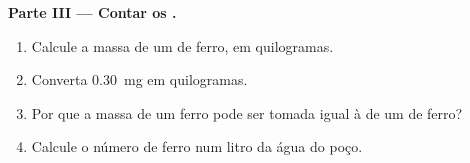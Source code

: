 \begin{problem}
\medskip
\noindent\textbf{Parte III --- Contar os .}
\begin{enumerate}[resume]
  \item Calcule a massa de um  de ferro, em quilogramas.
  \item Converta \qty{0.30}{mg} em quilogramas.
  \item Por que a massa de um  ferro pode ser tomada igual à de um
         de ferro?
  \item Calcule o número de  ferro num litro da água do poço.
\end{enumerate}
\end{problem}
